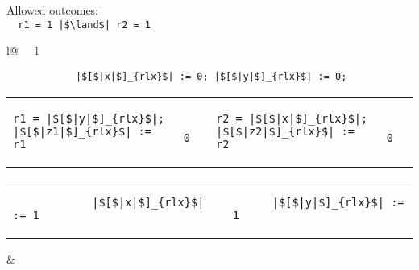 \begin{minipage}[t]{0.2\linewidth}
Allowed outcomes:\\
\lstinline{  r1 = 1 |$\land$| r2 = 1}\\
\end{minipage}
%
\begin{minipage}[t]{0.4\linewidth}
\vspace{-.2cm}
  \begin{tabular}{l@{\ \ \ }l}
    \begin{minipage}[l]{4.3cm} \small
\begin{lstlisting}
            |$[$|x|$]_{rlx}$| := 0; |$[$|y|$]_{rlx}$| := 0;
\end{lstlisting}
\vspace{-.2cm}
\begin{tabular}{l||l||l||l}
\begin{lstlisting}
r1 = |$[$|y|$]_{rlx}$|;
|$[$|z1|$]_{rlx}$| := r1
\end{lstlisting}
\hspace{.6cm}
&
\begin{lstlisting}
  0
\end{lstlisting}
\hspace{.6cm}
&
\begin{lstlisting}
r2 = |$[$|x|$]_{rlx}$|;
|$[$|z2|$]_{rlx}$| := r2
\end{lstlisting}
\hspace{.6cm}
&
\begin{lstlisting}
  0
\end{lstlisting}
\end{tabular}

\vspace{-1pt}
\begin{tabular}{l||l}
  \begin{lstlisting}
            |$[$|x|$]_{rlx}$| := 1
  \end{lstlisting}
\hspace{2.52em}
&
  \begin{lstlisting}
      |$[$|y|$]_{rlx}$| := 1
  \end{lstlisting}
\end{tabular}
    \end{minipage}
&
  \end{tabular}
\end{minipage}

\litmusTestEnd


